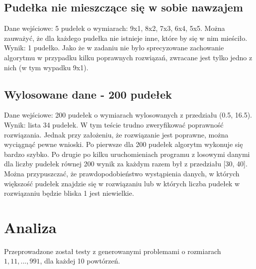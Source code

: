 \documentclass{article}
\begin{document}
\subsection{Pudełka nie mieszczące się w sobie nawzajem}
Dane wejściowe: 5 pudełek o wymiarach: 9x1, 8x2, 7x3, 6x4, 5x5. Można zauważyć, że dla każdego pudełka nie istnieje inne, które by się w nim mieściło.\\
Wynik: 1 pudełko. Jako że w zadaniu nie było sprecyzowane zachowanie algorytmu w przypadku kilku poprawnych rozwiązań, zwracane jest tylko jedno z nich (w tym wypadku 9x1).

\subsection{Wylosowane dane - 200 pudełek}
Dane wejściowe: 200 pudełek o wymiarach wylosowanych z przedziału (0.5, 16.5). \\
Wynik: lista 34 pudełek. W tym teście trudno zweryfikować poprawność rozwiązania. Jednak przy założeniu, że rozwiązanie jest poprawne, można wyciągnąć pewne wnioski. Po pierwsze dla 200 pudełek algorytm wykonuje się bardzo szybko. Po drugie po kilku uruchomieniach programu z losowymi danymi dla liczby pudełek równej 200 wynik za każdym razem był z przedziału [30, 40]. Można przypuszczać, że prawdopodobieństwo wystąpienia danych, w których większość pudełek znajdzie się w rozwiązaniu lub w których liczba pudełek w rozwiązaniu będzie bliska 1 jest niewielkie.
\clearpage
\section{Analiza}
Przeprowadzone został testy z generowanymi problemami o rozmiarach $1, 11, ... , 991$, dla każdej 10 powtórzeń.
\end{document}
